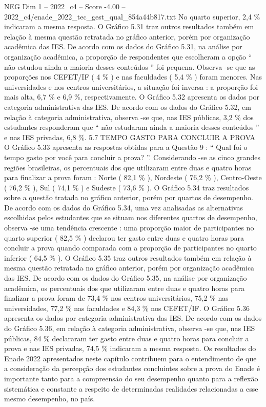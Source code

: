\begin{textsample}{NEG Dim 1 – 2022\_c4 – Score -4.00 – 2022\_c4/enade\_2022\_tec\_gest\_qual\_854a44b817.txt}
No quarto superior, 2,4 \% indicaram a mesma resposta.
O Gráfico 5.31 traz outros resultados também em relação à mesma questão retratada no gráfico anterior, porém por organização acadêmica das IES.
De acordo com os dados do Gráfico 5.31, na análise por organização acadêmica, a proporção de respondentes que escolheram a opção “ não estudou ainda a maioria desses conteúdos ” foi pequena.
Observa -se que as proporções nos CEFET/IF ( 4 \% ) e nas faculdades ( 5,4 \% ) foram menores.
Nas universidades e nos centros universitários, a situação foi inversa : a proporção foi mais alta, 6,7 \% e 6,9 \%, respectivamente.
O Gráfico 5.32 apresenta os dados por categoria administrativa das IES.
De acordo com os dados do Gráfico 5.32, em relação à categoria administrativa, observa -se que, nas IES públicas, 3,2 \% dos estudantes responderam que “ não estudaram ainda a maioria desses conteúdos ” e nas IES privadas, 6,8 \%. 5.7 TEMPO GASTO PARA CONCLUIR A PROVA O Gráfico 5.33 apresenta as respostas obtidas para a Questão 9 : “ Qual foi o tempo gasto por você para concluir a prova? ”.
Considerando -se as cinco grandes regiões brasileiras, os percentuais dos que utilizaram entre duas e quatro horas para finalizar a prova foram : Norte ( 82,1 \% ), Nordeste ( 76,2 \% ), Centro-Oeste ( 76,2 \% ), Sul ( 74,1 \% ) e Sudeste ( 73,6 \% ).
O Gráfico 5.34 traz resultados sobre a questão tratada no gráfico anterior, porém por quartos de desempenho.
De acordo com os dados do Gráfico 5.34, uma vez analisadas as alternativas escolhidas pelos estudantes que se situam nos diferentes quartos de desempenho, observa -se uma tendência crescente : uma proporção maior de participantes no quarto superior ( 82,5 \% ) declarou ter gasto entre duas e quatro horas para concluir a prova quando comparada com a proporção de participantes no quarto inferior ( 64,5 \% ).
O Gráfico 5.35 traz outros resultados também em relação à mesma questão retratada no gráfico anterior, porém por organização acadêmica das IES.
De acordo com os dados do Gráfico 5.35, na análise por organização acadêmica, os percentuais dos que utilizaram entre duas e quatro horas para finalizar a prova foram de 73,4 \% nos centros universitários, 75,2 \% nas universidades, 77,2 \% nas faculdades e 84,3 \% nos CEFET/IF.
O Gráfico 5.36 apresenta os dados por categoria administrativa das IES.
De acordo com os dados do Gráfico 5.36, em relação à categoria administrativa, observa -se que, nas IES públicas, 84 \% declararam ter gasto entre duas e quatro horas para concluir a prova e nas IES privadas, 74,5 \% indicaram a mesma resposta.
Os resultados do Enade 2022 apresentados neste capítulo contribuem para o entendimento de que a consideração da percepção dos estudantes concluintes sobre a prova do Enade é importante tanto para a compreensão do seu desempenho quanto para a reflexão sistemática e constante a respeito de determinadas realidades relacionadas a esse mesmo desempenho, no país.

\end{textsample}

